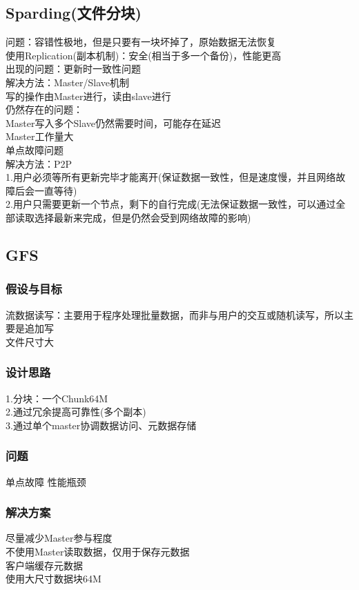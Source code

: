 \documentclass{article}
\begin{document}
\begin{CJK}{UTF8}{gbsn}
	\subsection*{Sparding(文件分块)}
	问题：容错性极地，但是只要有一块坏掉了，原始数据无法恢复\\
	使用Replication(副本机制)：安全(相当于多一个备份)，性能更高\\
	出现的问题：更新时一致性问题\\
	解决方法：Master/Slave机制\\
	写的操作由Master进行，读由slave进行\\
	仍然存在的问题：\\
	Master写入多个Slave仍然需要时间，可能存在延迟\\
	Master工作量大\\
	单点故障问题\\
	解决方法：P2P\\
	1.用户必须等所有更新完毕才能离开(保证数据一致性，但是速度慢，并且网络故障后会一直等待)\\
	2.用户只需要更新一个节点，剩下的自行完成(无法保证数据一致性，可以通过全部读取选择最新来完成，但是仍然会受到网络故障的影响)\\
	
	\subsection*{GFS}
	\subsubsection*{假设与目标}
	流数据读写：主要用于程序处理批量数据，而非与用户的交互或随机读写，所以主要是追加写\\
	文件尺寸大\\
	\subsubsection*{设计思路}
	1.分块：一个Chunk64M\\
	2.通过冗余提高可靠性(多个副本)\\
	3.通过单个master协调数据访问、元数据存储\\
	\subsubsection*{问题}
	单点故障
	性能瓶颈
	\subsubsection*{解决方案}
	尽量减少Master参与程度\\
	不使用Master读取数据，仅用于保存元数据\\
	客户端缓存元数据\\
	使用大尺寸数据块64M\\

\end{CJK}
\end{document}

